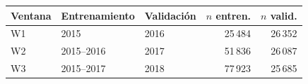 \begin{tabular}{lllrr}
\toprule
Ventana & Entrenamiento & Validación & $n$ entren. & $n$ valid. \\
\midrule
W1 & 2015 & 2016 & 25\,484 & 26\,352 \\
W2 & 2015–2016 & 2017 & 51\,836 & 26\,087 \\
W3 & 2015–2017 & 2018 & 77\,923 & 25\,685 \\
\bottomrule
\end{tabular}